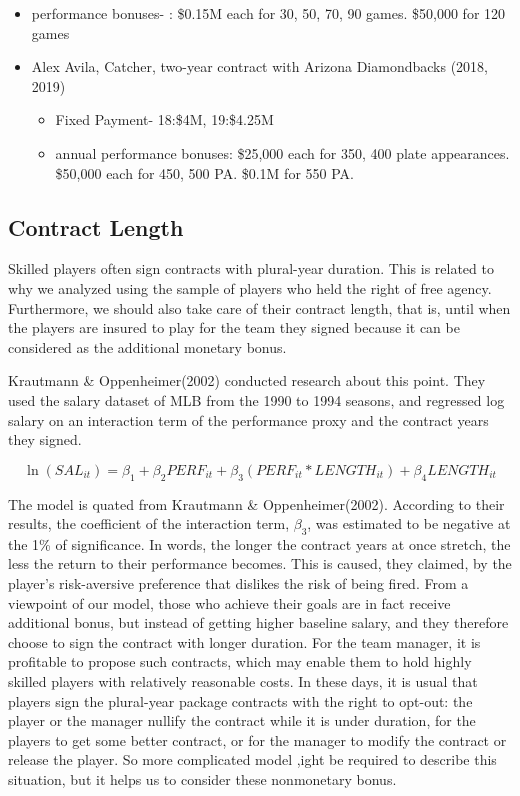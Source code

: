 \documentclass[dvipdfmx, 12pt]{article}
\begin{document}
\begin{table}
\begin{itemize}
\begin{itemize}
      \item performance bonuses- : \$0.15M each for 30, 50, 70, 90 games. \$50,000 for 120 games
    \end{itemize}
  \end{itemize}
  \begin{itemize}
  \item Alex Avila, Catcher, two-year contract with Arizona Diamondbacks (2018, 2019)

  \begin{itemize}
    \item Fixed Payment- 18:\$4M, 19:\$4.25M

    \item annual performance bonuses: \$25,000 each for 350, 400 plate appearances. \$50,000 each for 450, 500 PA. \$0.1M for 550 PA.
  \end{itemize}
 \end{itemize}
\end{table}

\subsection{Contract Length}

Skilled players often sign contracts with plural-year duration. This is related to why we analyzed using the sample of players who held the right of free agency. Furthermore, we should also take care of their contract length, that is, until when the players are insured to play for the team they signed because it can be considered as the additional monetary bonus.

Krautmann \& Oppenheimer(2002) conducted research about this point. They used the salary dataset of MLB from the 1990 to 1994 seasons, and regressed log salary on an interaction term of the performance proxy and the contract years they signed.

\[
\ln(SAL_{it}) = \beta_1 + \beta_2 PERF_{it} + \beta_3 (PERF_{it} * LENGTH_{it})+ \beta_4 LENGTH_{it}
\]

The model is quated from Krautmann \& Oppenheimer(2002). According to their results, the coefficient of the interaction term, $\beta_3$, was estimated to be negative at the 1\% of significance. In words, the longer the contract years at once stretch, the less the return to their performance becomes. This is caused, they claimed, by the player's risk-aversive preference that dislikes the risk of being fired. From a viewpoint of our model, those who achieve their goals are in fact receive additional bonus, but instead of getting higher baseline salary, and they therefore choose to sign the contract with longer duration. For the team manager, it is profitable to propose such contracts, which may enable them to hold highly skilled players with relatively reasonable costs. In these days, it is usual that players sign the plural-year package contracts with the right to opt-out: the player or the manager nullify the contract while it is under duration, for the players to get some better contract, or for the manager to modify the contract or release the player. So more complicated model ,ight be required to describe this situation, but it helps us to consider these nonmonetary bonus.
\end{document}
